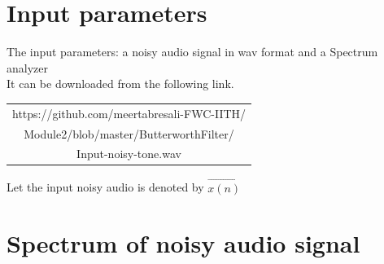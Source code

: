 \documentclass[journal,10pt,twocolumn]{article}
\begin{document}
\section{Input parameters}
\vspace{0.2cm}
The input parameters: a noisy audio signal in wav format and a Spectrum analyzer \\
It can be downloaded from the following link.\\
\begin{table}[h]
\centering
\begin{tabular}{| c |} \hline
 \rule{0pt}{20pt} https://github.com/meertabresali-FWC-IITH/\\
 Module2/blob/master/ButterworthFilter/ \\
 Input-noisy-tone.wav \\\hline
\end{tabular}
\end{table}

Let the input noisy audio is denoted by $\vec{x(n)}$

\section{Spectrum of noisy audio signal}
\end{document}

